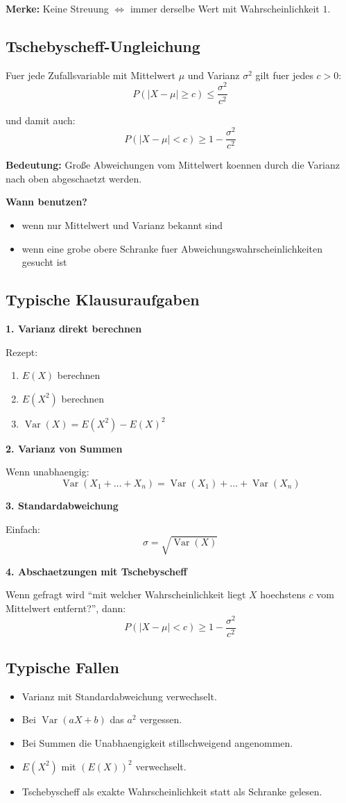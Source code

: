 \documentclass[a4paper,11pt]{article}
\begin{document}
\textbf{Merke:}
Keine Streuung $\Leftrightarrow$ immer derselbe Wert mit Wahrscheinlichkeit $1$.

\subsection{Tschebyscheff-Ungleichung}
Fuer jede Zufallsvariable mit Mittelwert $\mu$ und Varianz $\sigma^2$ gilt fuer jedes $c>0$:
\[
P(|X-\mu|\ge c)\le \frac{\sigma^2}{c^2}
\]

und damit auch:
\[
P(|X-\mu|<c)\ge 1-\frac{\sigma^2}{c^2}
\]

\textbf{Bedeutung:}
Große Abweichungen vom Mittelwert koennen durch die Varianz nach oben abgeschaetzt werden.

\textbf{Wann benutzen?}
\begin{itemize}
  \item wenn nur Mittelwert und Varianz bekannt sind
  \item wenn eine grobe obere Schranke fuer Abweichungswahrscheinlichkeiten gesucht ist
\end{itemize}

\subsection{Typische Klausuraufgaben}
\textbf{1. Varianz direkt berechnen}

Rezept:
\begin{enumerate}
  \item $E(X)$ berechnen
  \item $E(X^2)$ berechnen
  \item $\operatorname{Var}(X)=E(X^2)-E(X)^2$
\end{enumerate}

\textbf{2. Varianz von Summen}

Wenn unabhaengig:
\[
\operatorname{Var}(X_1+\dots+X_n)=\operatorname{Var}(X_1)+\dots+\operatorname{Var}(X_n)
\]

\textbf{3. Standardabweichung}

Einfach:
\[
\sigma=\sqrt{\operatorname{Var}(X)}
\]

\textbf{4. Abschaetzungen mit Tschebyscheff}

Wenn gefragt wird ``mit welcher Wahrscheinlichkeit liegt $X$ hoechstens $c$ vom Mittelwert entfernt?'', dann:
\[
P(|X-\mu|<c)\ge 1-\frac{\sigma^2}{c^2}
\]

\subsection{Typische Fallen}
\begin{itemize}
  \item Varianz mit Standardabweichung verwechselt.
  \item Bei $\operatorname{Var}(aX+b)$ das $a^2$ vergessen.
  \item Bei Summen die Unabhaengigkeit stillschweigend angenommen.
  \item $E(X^2)$ mit $(E(X))^2$ verwechselt.
  \item Tschebyscheff als exakte Wahrscheinlichkeit statt als Schranke gelesen.
\end{itemize}
\end{document}
